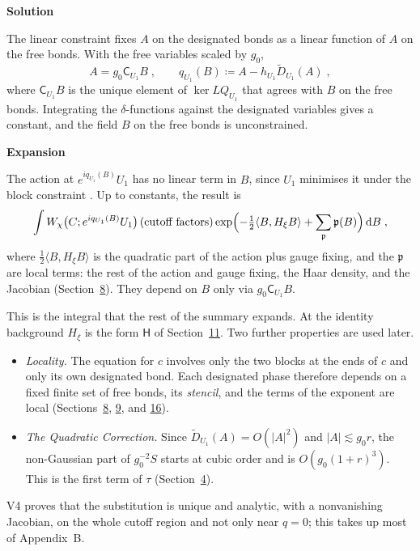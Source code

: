 \documentclass[11pt,a4paper]{article}
\newcommand{\dd}{\mathrm{d}}
\newcommand{\subhead}[1]{\par\vspace{4pt}\textbf{\color{ink}#1}\par}
\begin{document}
\subhead{Solution}
The linear constraint fixes $A$ on the designated bonds as a linear function of $A$ on the free bonds. With the free variables scaled by $g_0$,
\begin{equation*}
    A=g_0\mathsf C_{U_1}B\;,\qquad q_{U_1}(B)\coloneqq A-h_{U_1}\widetilde D_{U_1}(A)\;,
\end{equation*}
where $\mathsf C_{U_1}B$ is the unique element of $\ker LQ_{U_1}$ that agrees with $B$ on the free bonds. Integrating the $\delta$-functions against the designated variables gives a constant, and the field $B$ on the free bonds is unconstrained.

\subhead{Expansion}
The action at $e^{iq_{U_1}(B)}U_1$ has no linear term in $B$, since $U_1$ minimises it under the block constraint \cite[eq.~(1.12)]{BalabanCRE}. Up to constants, the result is \cite[eq.~(1.15)]{BalabanCRE}
\begin{equation*}
    \int W_\chi\bigl(C;e^{iq_{U_1}(B)}U_1\bigr)\,(\text{cutoff factors})\exp\Bigl(-\tfrac12\langle B,H_\xi B\rangle+\sum_{\mathfrak p}\mathfrak p(B)\Bigr)\,\dd B\;,
\end{equation*}
where $\tfrac12\langle B,H_\xi B\rangle$ is the quadratic part of the action plus gauge fixing, and the $\mathfrak p$ are local terms: the rest of the action and gauge fixing, the Haar density, and the Jacobian (Section~\hyperref[summary:8]{8}). They depend on $B$ only via $g_{0} \mathsf{C}_{U_1}B$.

This is the integral that the rest of the summary expands. At the identity background $H_\xi$ is the form $\mathsf H$ of Section~\hyperref[summary:11]{11}. Two further properties are used later.
\begin{itemize}
    \item \emph{Locality.} The equation for $c$ involves only the two blocks at the ends of $c$ and only its own designated bond. Each designated phase therefore depends on a fixed finite set of free bonds, its \emph{stencil}, and the terms of the exponent are local (Sections~\hyperref[summary:8]{8}, \hyperref[summary:9]{9}, and \hyperref[summary:16]{16}).
    \item \emph{The Quadratic Correction.} Since $\widetilde D_{U_1}(A)=O(|A|^2)$ and $|A|\lesssim g_0r$, the non-Gaussian part of $g_0^{-2}S$ starts at cubic order and is $O(g_0(1+r)^3)$. This is the first term of $\tau$ (Section~\hyperref[summary:4]{4}).
\end{itemize}
V4 proves that the substitution is unique and analytic, with a nonvanishing Jacobian, on the whole cutoff region and not only near $q=0$; this takes up most of Appendix~B.
\end{document}
